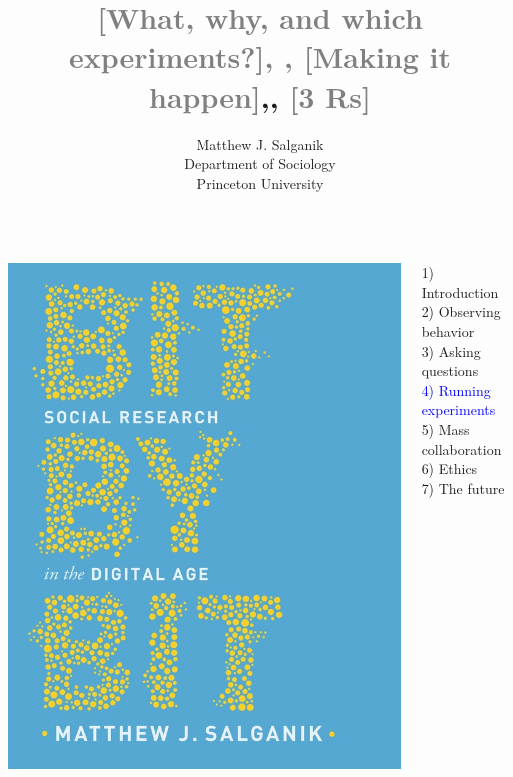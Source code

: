 \documentclass[aspectratio=169]{beamer}
\title[]{\textcolor{gray}{[What, why, and which experiments?], \newline [Moving beyond simple experiments], [Making it happen]},\newline [Zero variable cost data and MusicLab],  \textcolor{gray}{[3 Rs]}}
\author[]{Matthew J. Salganik\\Department of Sociology\\Princeton University}
\date[]{
\begin{flushright}
\texttt{[image: figures/cc-by.png]}
\end{flushright}
}
\begin{document}
\frame{\titlepage}
\begin{frame}

\begin{columns}
\begin{column}{.40\textwidth}
\includegraphics[width=\textwidth]{figures/salganik_bit_2018_cover}
\end{column}%

\hfill%

\begin{column}{.60\textwidth}
1) Introduction \\
2) Observing behavior \\
3) Asking questions \\
\textcolor{blue}{4) Running experiments} \\
5) Mass collaboration \\
6) Ethics \\
7) The future \\
\end{column}%
\end{columns}

\end{frame}
\end{document}

